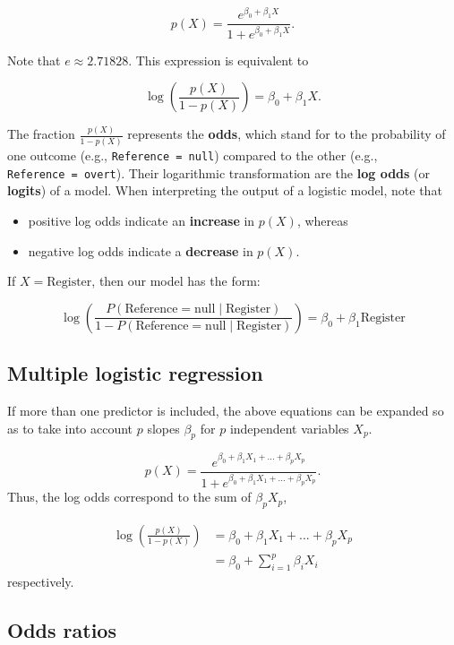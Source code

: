 \documentclass[
  11pt,
  letterpaper,
  DIV=11,
  numbers=noendperiod]{scrreprt}
\begin{document}
\[
p(X) = \frac{e^{\beta_0 + \beta_1X}}{1 + e^{\beta_0 + \beta_1X}}.
\]

Note that \(e \approx 2.71828\). This expression is equivalent to

\[
\log\left(\frac{p(X)}{1-p(X)}\right) = \beta_0 + \beta_1X.
\]

The fraction \(\frac{p(X)}{1-p(X)}\) represents the \textbf{odds}, which
stand for to the probability of one outcome (e.g.,
\texttt{Reference\ =\ null}) compared to the other (e.g.,
\texttt{Reference\ =\ overt}). Their logarithmic transformation are the
\textbf{log odds} (or \textbf{logits}) of a model. When interpreting the
output of a logistic model, note that

\begin{itemize}
\item
  positive log odds indicate an \textbf{increase} in \(p(X)\), whereas
\item
  negative log odds indicate a \textbf{decrease} in \(p(X)\).
\end{itemize}

If \(X = \text{Register}\), then our model has the form:

\[
\log\left(\frac{P(\text{Reference} = \text{null} \mid \text{Register})}{1- P(\text{Reference} = \text{null} \mid \text{Register})}\right) = \beta_0 + \beta_1\text{Register}
\]

\subsection{Multiple logistic
regression}\label{multiple-logistic-regression}

If more than one predictor is included, the above equations can be
expanded so as to take into account \(p\) slopes \(\beta_p\) for \(p\)
independent variables \(X_p\).

\[
p(X) = \frac{e^{\beta_0 + \beta_1X_1 + ... +  \beta_pX_p}}{1 + e^{\beta_0 + \beta_1X_1 + ... + \beta_pX_p}}.
\] Thus, the log odds correspond to the sum of \(\beta_pX_p\),

\[
\begin{aligned}
\log\left(\frac{p(X)}{1-p(X)}\right) &= \beta_0 + \beta_1X_1 + ... +  \beta_pX_p \\
& = \beta_0 + \sum_{i=1}^{p} \beta_i X_i
\end{aligned}
\] respectively.

\subsection{Odds ratios}\label{odds-ratios}
\end{document}
